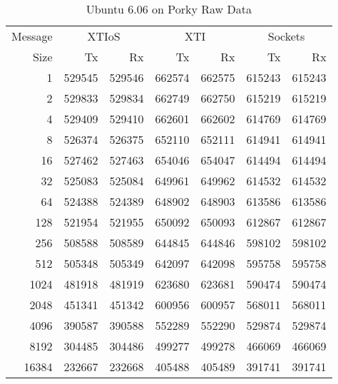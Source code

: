 \documentclass[letterpaper,final,notitlepage,twocolumn,10pt,twoside]{article}
\let\normalsize\small
\let\small\footnotesize
\let\footnotesize\scriptsize
\let\scriptsize\tiny
\begin{document}
\begin{appendix}
\begin{table}[hbp]
\normalsize
\begin{center}
\setlength{\tabcolsep}{0.3em}
\setlength{\arraycolsep}{0.3em}
\begin{tabular}{rrrrrrr}\\
Message & \multicolumn{2}{c}{XTIoS} & \multicolumn{2}{c}{XTI} & \multicolumn{2}{c}{Sockets}\\
Size & Tx & Rx & Tx & Rx & Tx & Rx\\
\hline
\hline
1 & 529545 & 529546 & 662574 & 662575 & 615243 & 615243\\
2 & 529833 & 529834 & 662749 & 662750 & 615219 & 615219\\
4 & 529409 & 529410 & 662601 & 662602 & 614769 & 614769\\
8 & 526374 & 526375 & 652110 & 652111 & 614941 & 614941\\
16 & 527462 & 527463 & 654046 & 654047 & 614494 & 614494\\
32 & 525083 & 525084 & 649961 & 649962 & 614532 & 614532\\
64 & 524388 & 524389 & 648902 & 648903 & 613586 & 613586\\
128 & 521954 & 521955 & 650092 & 650093 & 612867 & 612867\\
256 & 508588 & 508589 & 644845 & 644846 & 598102 & 598102\\
512 & 505348 & 505349 & 642097 & 642098 & 595758 & 595758\\
1024 & 481918 & 481919 & 623680 & 623681 & 590474 & 590474\\
2048 & 451341 & 451342 & 600956 & 600957 & 568011 & 568011\\
4096 & 390587 & 390588 & 552289 & 552290 & 529874 & 529874\\
8192 & 304485 & 304486 & 499277 & 499278 & 466069 & 466069\\
16384 & 232667 & 232668 & 405488 & 405489 & 391741 & 391741\\
\hline
\end{tabular}
\end{center}
\normalsize
\caption[Ubuntu 6.06 on Porky Raw Data]{Ubuntu 6.06 on Porky Raw Data}
\label{table:ubuntudata}
\end{table}


\end{appendix}
\end{document}

